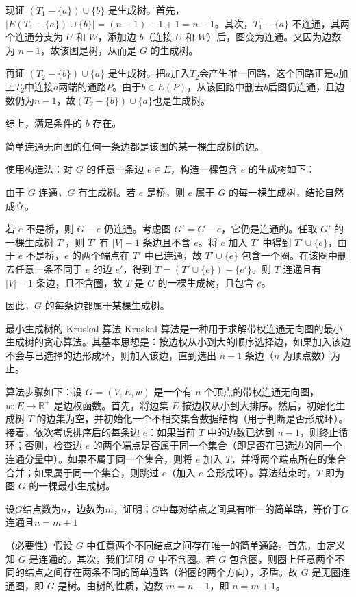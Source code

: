 现证 $(T_1-\{a\})\cup\{b\}$ 是生成树。首先，$|E(T_1-\{a\})\cup\{b\}| = (n-1)-1+1 = n-1$。其次，$T_1-\{a\}$ 不连通，其两个连通分支为 $U$ 和 $W$，添加边 $b$（连接 $U$ 和 $W$）后，图变为连通。又因为边数为 $n-1$，故该图是树，从而是 $G$ 的生成树。

再证 $(T_2-\{b\})\cup\{a\}$ 是生成树。把$a$加入$T_2$会产生唯一回路，这个回路正是$a$加上$T_2$中连接$a$两端的通路$P$。由于$b\in E(P)$，从该回路中删去$b$后图仍连通，且边数仍为$n-1$，故$(T_2-\{b\})\cup\{a\}$也是生成树。

综上，满足条件的 $b$ 存在。
\begin{theorem}{}{}
    简单连通无向图的任何一条边都是该图的某一棵生成树的边。
\end{theorem}
使用构造法：对 $G$ 的任意一条边 $e \in E$，构造一棵包含 $e$ 的生成树如下：
    
由于 $G$ 连通，$G$ 有生成树。若 $e$ 是桥，则 $e$ 属于 $G$ 的每一棵生成树，结论自然成立。
    
若 $e$ 不是桥，则 $G-e$ 仍连通。考虑图 $G' = G-e$，它仍是连通的。任取 $G'$ 的一棵生成树 $T'$，则 $T'$ 有 $|V|-1$ 条边且不含 $e$。将 $e$ 加入 $T'$ 中得到 $T' \cup \{e\}$，由于 $e$ 不是桥，$e$ 的两个端点在 $T'$ 中已连通，故 $T' \cup \{e\}$ 包含一个圈。在该圈中删去任意一条不同于 $e$ 的边 $e'$，得到 $T = (T' \cup \{e\}) - \{e'\}$。则 $T$ 连通且有 $|V|-1$ 条边，且不含圈，故 $T$ 是 $G$ 的一棵生成树，且包含 $e$。
    
因此，$G$ 的每条边都属于某棵生成树。

\begin{theorem}{最小生成树的 Kruskal 算法}{}
    Kruskal 算法是一种用于求解带权连通无向图的最小生成树的贪心算法。其基本思想是：按边权从小到大的顺序选择边，如果加入该边不会与已选择的边形成环，则加入该边，直到选出 $n-1$ 条边（$n$ 为顶点数）为止。

    算法步骤如下：设 $G=(V,E,w)$ 是一个有 $n$ 个顶点的带权连通无向图，$w:E\to \mathbb{R}^+$ 是边权函数。首先，将边集 $E$ 按边权从小到大排序。然后，初始化生成树 $T$ 的边集为空，并初始化一个不相交集合数据结构（用于判断是否形成环）。接着，依次考虑排序后的每条边 $e$：如果当前 $T$ 中的边数已达到 $n-1$，则终止循环；否则，检查边 $e$ 的两个端点是否属于同一个集合（即是否在已选边的同一个连通分量中）。如果不属于同一个集合，则将 $e$ 加入 $T$，并将两个端点所在的集合合并；如果属于同一个集合，则跳过 $e$（加入 $e$ 会形成环）。算法结束时，$T$ 即为图 $G$ 的一棵最小生成树。
\end{theorem}
\begin{example}{}{}
    设$G$结点数为$n$，边数为$m$，证明：$G$中每对结点之间具有唯一的简单路，等价于$G$连通且$n=m+1$
\end{example}
（必要性）假设 $G$ 中任意两个不同结点之间存在唯一的简单通路。首先，由定义知 $G$ 是连通的。其次，我们证明 $G$ 中不含圈。若 $G$ 包含圈，则圈上任意两个不同的结点之间存在两条不同的简单通路（沿圈的两个方向），矛盾。故 $G$ 是无圈连通图，即 $G$ 是树。由树的性质，边数 $m = n-1$，即 $n = m+1$。

